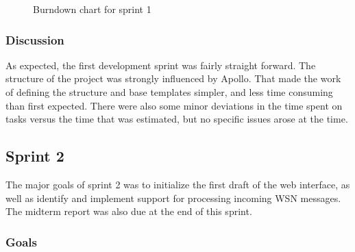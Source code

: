 \begin{center}
  \begin{figure}[htbp!]
    \caption{Burndown chart for sprint 1}
    \label{fig:sprint 1, burndown}
  \end{figure}
\end{center}

\subsubsection{Discussion}
\label{subsec:project_lifecycle-development-sprint_1-discussion}

As expected, the first development sprint was fairly straight forward. The structure of the project was strongly influenced by Apollo. That made the work of defining the structure and base templates simpler, and less time consuming than first expected. There were also some minor deviations in the time spent on tasks versus the time that was estimated, but no specific issues arose at the time.

\subsection{Sprint 2}
\label{subsec:project_lifecycle-development-sprint_2}

The major goals of sprint 2 was to initialize the first draft of the web interface, as well as identify and implement support for processing incoming WSN messages. The midterm report was also due at the end of this sprint.

\subsubsection{Goals}
\label{subsec:project_lifecycle-development-sprint_2-goals}

